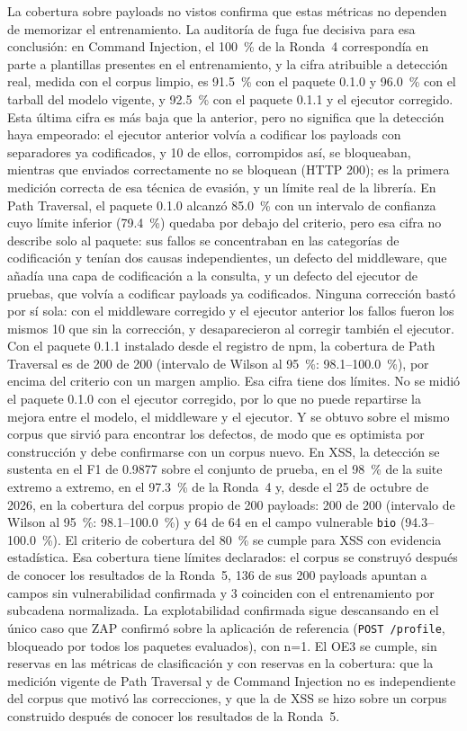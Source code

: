La cobertura sobre payloads no vistos confirma que estas métricas no dependen de memorizar el
entrenamiento. La auditoría de fuga fue decisiva para esa conclusión: en Command Injection, el
100~\% de la Ronda~4 correspondía en parte a plantillas presentes en el entrenamiento, y la cifra
atribuible a detección real, medida con el corpus limpio, es 91.5~\% con el paquete 0.1.0 y
96.0~\% con el tarball del modelo vigente, y 92.5~\% con el paquete 0.1.1 y el ejecutor corregido.
Esta última cifra es más baja que la anterior, pero no significa que la detección haya empeorado:
el ejecutor anterior volvía a codificar los payloads con separadores ya codificados, y 10 de ellos,
corrompidos así, se bloqueaban, mientras que enviados correctamente no se bloquean (HTTP 200); es la
primera medición correcta de esa técnica de evasión, y un límite real de la librería. En Path
Traversal, el paquete 0.1.0 alcanzó 85.0~\% con un intervalo de confianza cuyo límite inferior
(79.4~\%) quedaba por debajo del criterio, pero esa cifra no describe solo al paquete: sus fallos se
concentraban en las categorías de codificación y tenían dos causas independientes, un defecto del
middleware, que añadía una capa de codificación a la consulta, y un defecto del ejecutor de pruebas,
que volvía a codificar payloads ya codificados. Ninguna corrección bastó por sí sola: con el
middleware corregido y el ejecutor anterior los fallos fueron los mismos 10 que sin la corrección, y
desaparecieron al corregir también el ejecutor. Con el paquete 0.1.1 instalado desde el registro de
npm, la cobertura de Path Traversal es de 200 de 200 (intervalo de Wilson al 95~\%: 98.1--100.0~\%),
por encima del criterio con un margen amplio. Esa cifra tiene dos límites. No se midió el paquete
0.1.0 con el ejecutor corregido, por lo que no puede repartirse la mejora entre el modelo, el
middleware y el ejecutor. Y se obtuvo sobre el mismo corpus que sirvió para encontrar los
defectos, de modo que es optimista por construcción y debe confirmarse con un corpus nuevo. En XSS,
la detección se sustenta en el F1 de 0.9877 sobre el conjunto de prueba, en el 98~\% de la suite
extremo a extremo, en el 97.3~\% de la Ronda~4 y, desde el 25 de octubre de 2026, en la cobertura
del corpus propio de 200 payloads: 200 de 200 (intervalo de Wilson al 95~\%: 98.1--100.0~\%) y 64
de 64 en el campo vulnerable \texttt{bio} (94.3--100.0~\%). El criterio de cobertura del 80~\% se
cumple para XSS con evidencia estadística. Esa cobertura tiene límites declarados: el corpus se
construyó después de conocer los resultados de la Ronda~5, 136 de sus 200 payloads apuntan a
campos sin vulnerabilidad confirmada y 3 coinciden con el entrenamiento por subcadena normalizada.
La explotabilidad confirmada sigue descansando en el único caso que ZAP confirmó sobre la
aplicación de referencia (\texttt{POST /profile}, bloqueado por todos los paquetes evaluados), con
n=1. El OE3 se cumple, sin reservas en las métricas de clasificación y con reservas en la
cobertura: que la medición vigente de Path Traversal y de Command Injection no es independiente
del corpus que motivó las correcciones, y que la de XSS se hizo sobre un corpus construido después
de conocer los resultados de la Ronda~5.

